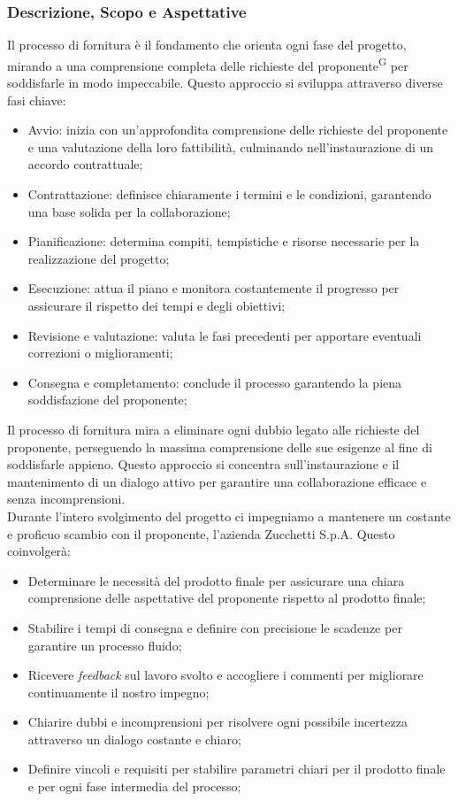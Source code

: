 \documentclass[5pt]{article}
\begin{document}
\subsubsection{Descrizione, Scopo e Aspettative }
Il processo di fornitura è il fondamento che orienta ogni fase del progetto, mirando a una comprensione completa delle richieste del proponente\textsuperscript{G} per soddisfarle in modo impeccabile. Questo approccio si sviluppa attraverso diverse fasi chiave:
\begin{itemize}
    \item{Avvio:} inizia con un'approfondita comprensione delle richieste del proponente e una valutazione della loro fattibilità, culminando nell'instaurazione di un accordo contrattuale;
    \item{Contrattazione:} definisce chiaramente i termini e le condizioni, garantendo una base solida per la collaborazione;
    \item{Pianificazione:} determina compiti, tempistiche e risorse necessarie per la realizzazione del progetto;
    \item{Esecuzione:} attua il piano e monitora costantemente il progresso per assicurare il rispetto dei tempi e degli obiettivi;
    \item{Revisione e valutazione:} valuta le fasi precedenti per apportare eventuali correzioni o miglioramenti;
    \item{Consegna e completamento:} conclude il processo garantendo la piena soddisfazione del proponente;
\end{itemize}
Il processo di fornitura mira a eliminare ogni dubbio legato alle richieste del proponente, perseguendo la massima comprensione delle sue esigenze al fine di soddisfarle appieno. Questo approccio si concentra sull'instaurazione e il mantenimento di un dialogo attivo per garantire una collaborazione efficace e senza incomprensioni.\\
Durante l'intero svolgimento del progetto ci impegniamo a mantenere un costante e proficuo scambio con il proponente, l'azienda Zucchetti S.p.A. Questo coinvolgerà:
\begin{itemize}
    \item Determinare le necessità del prodotto finale per assicurare una chiara comprensione delle aspettative del proponente rispetto al prodotto finale;
    \item Stabilire i tempi di consegna e definire con precisione le scadenze per garantire un processo fluido;
    \item Ricevere \textit{feedback} sul lavoro svolto e accogliere i commenti per migliorare continuamente il nostro impegno;
    \item Chiarire dubbi e incomprensioni per risolvere ogni possibile incertezza attraverso un dialogo costante e chiaro;
    \item Definire vincoli e requisiti per stabilire parametri chiari per il prodotto finale e per ogni fase intermedia del processo;
\end{itemize}
\end{document}
